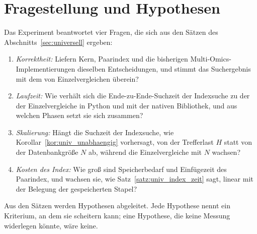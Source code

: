 \documentclass[a4paper,12pt, twoside]{report}
\theoremstyle{definition}
\begin{document}
\section{Fragestellung und Hypothesen}
\label{sec:ucx_hypothesen}

Das Experiment beantwortet vier Fragen, die sich aus den Sätzen des Abschnitts~\ref{sec:universell} ergeben:
\begin{enumerate}[label=(\arabic*)]
	\item \emph{Korrektheit:} Liefern Kern, Paarindex und die bisherigen Multi-Omics-Implementierungen dieselben Entscheidungen, und stimmt das Suchergebnis mit dem von Einzelvergleichen überein?
	\item \emph{Laufzeit:} Wie verhält sich die Ende-zu-Ende-Suchzeit der Indexsuche zu der der Einzelvergleiche in Python und mit der nativen Bibliothek, und aus welchen Phasen setzt sie sich zusammen?
	\item \emph{Skalierung:} Hängt die Suchzeit der Indexsuche, wie Korollar~\ref{kor:univ_unabhaengig} vorhersagt, von der Trefferlast $H$ statt von der Datenbankgröße $N$ ab, während die Einzelvergleiche mit $N$ wachsen?
	\item \emph{Kosten des Index:} Wie groß sind Speicherbedarf und Einfügezeit des Paarindex, und wachsen sie, wie Satz~\ref{satz:univ_index_zeit} sagt, linear mit der Belegung der gespeicherten Stapel?
\end{enumerate}

Aus den Sätzen werden Hypothesen abgeleitet. Jede Hypothese nennt ein Kriterium, an dem sie scheitern kann; eine Hypothese, die keine Messung widerlegen könnte, wäre keine.
\end{document}
